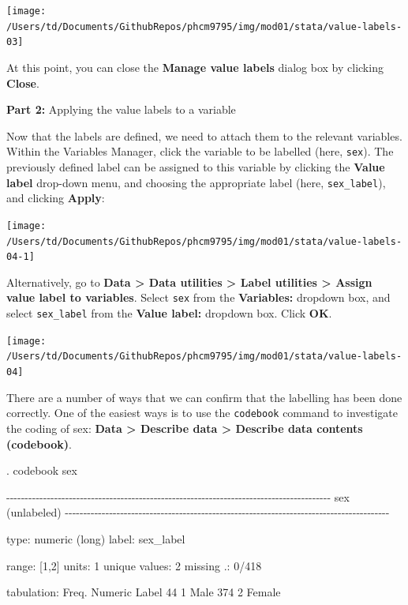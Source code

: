 \documentclass[
]{memoir}
\newenvironment{Shaded}{\begin{snugshade}}{\end{snugshade}}
\newcommand{\NormalTok}[1]{#1}
\begin{document}
\texttt{[image: /Users/td/Documents/GithubRepos/phcm9795/img/mod01/stata/value-labels-03]}

At this point, you can close the \textbf{Manage value labels} dialog box by clicking \textbf{Close}.

\textbf{Part 2:} Applying the value labels to a variable

Now that the labels are defined, we need to attach them to the relevant variables. Within the Variables Manager, click the variable to be labelled (here, \texttt{sex}). The previously defined label can be assigned to this variable by clicking the \textbf{Value label} drop-down menu, and choosing the appropriate label (here, \texttt{sex\_label}), and clicking \textbf{Apply}:

\texttt{[image: /Users/td/Documents/GithubRepos/phcm9795/img/mod01/stata/value-labels-04-1]}

Alternatively, go to \textbf{Data \textgreater{} Data utilities \textgreater{} Label utilities \textgreater{} Assign value label to variables}. Select \texttt{sex} from the \textbf{Variables:} dropdown box, and select \texttt{sex\_label} from the \textbf{Value label:} dropdown box. Click \textbf{OK}.

\texttt{[image: /Users/td/Documents/GithubRepos/phcm9795/img/mod01/stata/value-labels-04]}

There are a number of ways that we can confirm that the labelling has been done correctly. One of the easiest ways is to use the \texttt{codebook} command to investigate the coding of sex: \textbf{Data \textgreater{} Describe data \textgreater{} Describe data contents (codebook)}.

\begin{Shaded}
\begin{Highlighting}[]
\NormalTok{. codebook sex}

\NormalTok{{-}{-}{-}{-}{-}{-}{-}{-}{-}{-}{-}{-}{-}{-}{-}{-}{-}{-}{-}{-}{-}{-}{-}{-}{-}{-}{-}{-}{-}{-}{-}{-}{-}{-}{-}{-}{-}{-}{-}{-}{-}{-}{-}{-}{-}{-}{-}{-}{-}{-}{-}{-}{-}{-}{-}{-}{-}{-}{-}{-}{-}{-}{-}{-}{-}{-}{-}{-}{-}{-}{-}{-}{-}{-}{-}{-}{-}{-}{-}{-}{-}{-}{-}{-}{-}{-}{-}{-}}
\NormalTok{sex                                                                          (unlabeled)}
\NormalTok{{-}{-}{-}{-}{-}{-}{-}{-}{-}{-}{-}{-}{-}{-}{-}{-}{-}{-}{-}{-}{-}{-}{-}{-}{-}{-}{-}{-}{-}{-}{-}{-}{-}{-}{-}{-}{-}{-}{-}{-}{-}{-}{-}{-}{-}{-}{-}{-}{-}{-}{-}{-}{-}{-}{-}{-}{-}{-}{-}{-}{-}{-}{-}{-}{-}{-}{-}{-}{-}{-}{-}{-}{-}{-}{-}{-}{-}{-}{-}{-}{-}{-}{-}{-}{-}{-}{-}{-}}

\NormalTok{                  type:  numeric (long)}
\NormalTok{                 label:  sex\_label}

\NormalTok{                 range:  [1,2]                        units:  1}
\NormalTok{         unique values:  2                        missing .:  0/418}

\NormalTok{            tabulation:  Freq.   Numeric  Label}
\NormalTok{                            44         1  Male}
\NormalTok{                           374         2  Female}
\end{Highlighting}
\end{Shaded}
\end{document}

